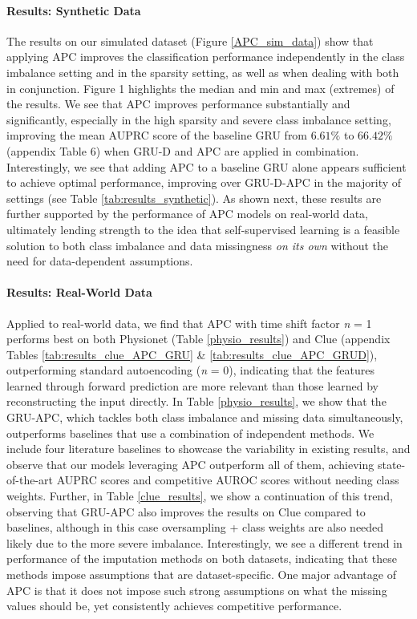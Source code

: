 \documentclass{article}
\begin{document}
\paragraph{Results: Synthetic Data}
The results on our simulated dataset (Figure \ref{APC_sim_data}) show that applying APC improves the classification performance independently in the class imbalance setting and in the sparsity setting, as well as when dealing with both in conjunction.
Figure 1 highlights the median and min and max (extremes) of the results.
We see that APC improves performance substantially and significantly, especially in the high sparsity and severe class imbalance setting, improving the mean AUPRC score of the baseline GRU from $6.61\%$ to $66.42\%$ (appendix Table 6) when GRU-D and APC are applied in combination. Interestingly, we see that adding APC to a baseline GRU alone appears sufficient to achieve optimal performance, improving over GRU-D-APC in the majority of settings (see Table \ref{tab:results_synthetic}). As shown next, these results are further supported by the performance of APC models on real-world data, ultimately lending strength to the idea that self-supervised learning is a feasible solution to both class imbalance and data missingness \emph{on its own} without the need for data-dependent assumptions.

\paragraph{Results: Real-World Data}
Applied to real-world data, we find that APC with time shift factor \textit{n} = 1 
performs best on both Physionet (Table \ref{physio_results}) and Clue (appendix Tables \ref{tab:results_clue_APC_GRU} \& \ref{tab:results_clue_APC_GRUD}), outperforming standard autoencoding (\textit{n} = 0),
indicating that the features learned through forward prediction are more relevant than those learned by reconstructing the input directly. 
In Table \ref{physio_results}, we show that the GRU-APC, which tackles both class imbalance and missing data simultaneously, outperforms baselines that use a combination of independent methods.
We include four literature baselines to showcase the variability in existing results, and observe that our models leveraging APC outperform all of them, achieving state-of-the-art AUPRC scores and competitive AUROC scores without needing class weights.
Further, in Table \ref{clue_results}, we show a continuation of this trend, observing that GRU-APC also improves the results on Clue compared to baselines, although in this case oversampling + class weights are also needed likely due to the more severe imbalance.
Interestingly, we see a different trend in performance of the imputation methods on both datasets, 
indicating that these methods impose assumptions that are dataset-specific. 
One major advantage of APC is that it does not impose such strong assumptions on what the missing values should be, yet consistently achieves competitive performance.
\end{document}
